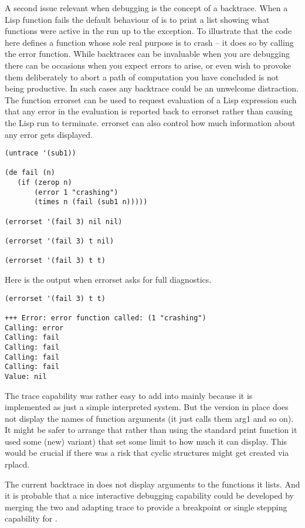 A second issue relevant when debugging is the concept of a backtrace.
When a Lisp function fails the default behaviour of \vsl{} is to print
a list showing what functions were active in the run up to the exception.
To illustrate that the code here defines a function whose sole real purpose
is to crash -- it does so by calling the {\tx error} function. While
backtraces can be invaluable when you are debugging there can be occasions
when you expect errors to arise, or even wish to provoke them deliberately
to abort a path of computation you have concluded is not being productive.
In such cases any backtrace could be an unwelcome distraction. The function
{\tx errorset} can be used to request evaluation of a Lisp expression
such that any error in the evaluation is reported back to {\tx errorset}
rather than causing the Lisp run to terminate. {\tx errorset} can also
control how much information about any error gets displayed.
{\small\begin{verbatim}
(untrace '(sub1))

(de fail (n)
   (if (zerop n)
       (error 1 "crashing")
       (times n (fail (sub1 n)))))

(errorset '(fail 3) nil nil)

(errorset '(fail 3) t nil)

(errorset '(fail 3) t t)
\end{verbatim}}

Here is the output when {\tx errorset} asks for full diagnostics.
{\small\begin{verbatim}
(errorset '(fail 3) t t)

+++ Error: error function called: (1 "crashing")
Calling: error
Calling: fail
Calling: fail
Calling: fail
Calling: fail
Value: nil
\end{verbatim}}

The {\tx trace} capability was rather easy to add into \vsl{} mainly because
it is implemented as just a simple interpreted system. But the version in
place does not display the names of function arguments (it just calls them
{\tx arg1} and so on). It might be safer to arrange that rather than
using the standard {\tx print} function it used some (new) variant) that
set some limit to how much it can display. This would be crucial if
there was a risk that cyclic structures might get created via {\tx rplacd}.

The current backtrace in \vsl{} does not display arguments to the functions
it lists. And it is probable that a nice interactive debugging capability
could be developed by merging the two and adapting {\tx trace} to provide
a breakpoint or single stepping capability for \vsl. 

